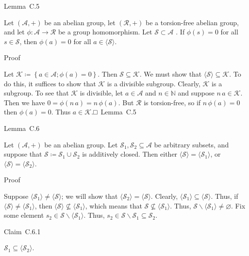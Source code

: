 \documentclass[
]{article}
\begin{document}
Lemma~C.5

Let \(\left( \mathcal{A}, + \right)\) be an abelian group, let
\(\left( \mathcal{R}, + \right)\) be a torsion-free abelian group, and
let \(\left. \phi:\mathcal{A}\longrightarrow\mathcal{R} \right.\) be a
group homomorphism. Let \(\mathcal{S} \subset \mathcal{A}\) . If
\(\phi(s) = 0\) for all \(s \in \mathcal{S}\), then \(\phi(a) = 0\) for
all \(a \in {\langle\mathcal{S}\rangle}\).

Proof

Let \(\mathcal{K} ≔ \left\{ a \in \mathcal{A};\phi(a) = 0 \right\}\).
Then \(\mathcal{S} \subseteq \mathcal{K}\). We must show that
\({\langle\mathcal{S}\rangle} \subseteq \mathcal{K}\). To do this, it
suffices to show that \(\mathcal{K}\) is a divisible subgroup. Clearly,
\(\mathcal{K}\) is a subgroup. To see that \(\mathcal{K}\) is divisible,
let \(a \in \mathcal{A}\) and \(n \in \mathbb{N}\) and suppose
\(n\, a \in \mathcal{K}\). Then we have
\(0 = \phi(n\, a) = n\,\phi(a)\). But \(\mathcal{R}\) is torsion-free,
so if \(n\,\phi(a) = 0\) then \(\phi(a) = 0\). Thus
\(a \in \mathcal{K}\).□~Lemma~C.5

Lemma~C.6

Let \(\left( \mathcal{A}, + \right)\) be an abelian group. Let
\(\mathcal{S}_{1},\mathcal{S}_{2} \subseteq \mathcal{A}\) be arbitrary
subsets, and suppose that
\(\mathcal{S} ≔ \mathcal{S}_{1} \cup \mathcal{S}_{2}\) is additively
closed. Then either
\({\langle\mathcal{S}\rangle} = {\langle\mathcal{S}_{1}\rangle}\), or
\({\langle\mathcal{S}\rangle} = {\langle\mathcal{S}_{2}\rangle}\).

Proof

Suppose
\({\langle\mathcal{S}_{1}\rangle} \neq {\langle\mathcal{S}\rangle}\); we
will show that
\({\langle\mathcal{S}_{2}\rangle} = {\langle\mathcal{S}\rangle}\).
Clearly,
\({\langle\mathcal{S}_{1}\rangle} \subseteq {\langle\mathcal{S}\rangle}\).
Thus, if
\({\langle\mathcal{S}\rangle} \neq {\langle\mathcal{S}_{1}\rangle}\),
then
\({\langle\mathcal{S}\rangle} \nsubseteq {\langle\mathcal{S}_{1}\rangle}\),
which means that
\(\mathcal{S} \nsubseteq {\langle\mathcal{S}_{1}\rangle}\). Thus,
\(\mathcal{S} \smallsetminus {\langle\mathcal{S}_{1}\rangle} \neq \varnothing\).
Fix some element
\(s_{2} \in \mathcal{S} \smallsetminus {\langle\mathcal{S}_{1}\rangle}\).
Thus,
\(s_{2} \in \mathcal{S} \smallsetminus \mathcal{S}_{1} \subseteq \mathcal{S}_{2}\).

Claim~C.6.1

\(\mathcal{S}_{1} \subseteq {\langle\mathcal{S}_{2}\rangle}\).
\end{document}
